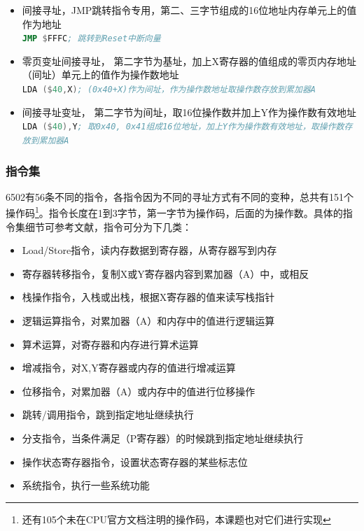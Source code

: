 \documentclass[a4paper]{ltxdoc}
\begin{document}
{\begin{itemize}
 \mintinline [breaklines]{asm}{STA $3000,Y; 将内存地址(0x3000+Y)上的存储单元的值存放到累加器A}
\item 间接寻址，JMP跳转指令专用，第二、三字节组成的16位地址内存单元上的值作为地址\\
 \mintinline [breaklines]{asm}{JMP $FFFC; 跳转到Reset中断向量}
\item 零页变址间接寻址， 第二字节为基址，加上X寄存器的值组成的零页内存地址（间址）单元上的值作为操作数地址\\
 \mintinline [breaklines]{asm}{LDA ($40,X); (0x40+X)作为间址，作为操作数地址取操作数存放到累加器A}
\item 间接寻址变址， 第二字节为间址，取16位操作数并加上Y作为操作数有效地址\\
 \mintinline [breaklines]{asm}{LDA ($40),Y; 取0x40, 0x41组成16位地址，加上Y作为操作数有效地址，取操作数存放到累加器A}
\end{itemize}


\subsubsection{指令集}
6502有56条不同的指令，各指令因为不同的寻址方式有不同的变种，总共有151个操作码\footnote{还有105个未在CPU官方文档注明的操作码，本课题也对它们进行实现}。指令长度在1到3字节，第一字节为操作码，后面的为操作数。具体的指令集细节可参考文献\cite{6502instruction}，指令可分为下几类：
\begin{itemize}
	\item Load/Store指令，读内存数据到寄存器，从寄存器写到内存
	\item 寄存器转移指令，复制X或Y寄存器内容到累加器（A）中，或相反
	\item 栈操作指令，入栈或出栈，根据X寄存器的值来读写栈指针
	\item 逻辑运算指令，对累加器（A）和内存中的值进行逻辑运算
	\item 算术运算，对寄存器和内存进行算术运算
	\item 增减指令，对X,Y寄存器或内存的值进行增减运算
	\item 位移指令，对累加器（A）或内存中的值进行位移操作
	\item 跳转/调用指令，跳到指定地址继续执行
	\item 分支指令，当条件满足（P寄存器）的时候跳到指定地址继续执行
	\item 操作状态寄存器指令，设置状态寄存器的某些标志位
	\item 系统指令，执行一些系统功能
\end{itemize}

}
\end{document}
